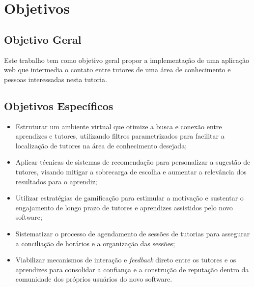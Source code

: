 


\section[Objetivos]{Objetivos}
\label{sec:objetivos}

\subsection[Objetivo geral]{Objetivo Geral}

Este trabalho tem como objetivo geral propor a implementação de uma aplicação web que intermedia o contato entre tutores de uma área de conhecimento e pessoas interessadas nesta tutoria.

\subsection[Objetivos específicos]{Objetivos Específicos}

\begin{itemize}
    \item Estruturar um ambiente virtual que otimize a busca e conexão entre aprendizes e tutores, utilizando filtros parametrizados para facilitar a localização de tutores na área de conhecimento desejada;
    
    \item Aplicar técnicas de sistemas de recomendação para personalizar a sugestão de tutores, visando mitigar a sobrecarga de escolha e aumentar a relevância dos resultados para o aprendiz;
    
    \item Utilizar estratégias de gamificação para estimular a motivação e sustentar o engajamento de longo prazo de tutores e aprendizes assistidos pelo novo software;

    \item Sistematizar o processo de agendamento de sessões de tutorias para assegurar a conciliação de horários e a organização das sessões;
    
    \item Viabilizar mecanismos de interação e \textit{feedback} direto entre os tutores e os aprendizes para consolidar a confiança e a construção de reputação dentro da comunidade dos próprios usuários do novo software.
    
\end{itemize}

